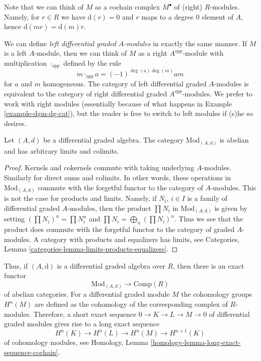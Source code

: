 \noindent
Note that we can think of $M$ as a cochain complex $M^\bullet$
of (right) $R$-modules. Namely, for $r \in R$ we have $\text{d}(r) = 0$
and $r$ maps to a degree $0$ element of $A$, hence
$\text{d}(mr) = \text{d}(m)r$.

\medskip\noindent
We can define {\it left differential graded $A$-modules} in exactly the same
manner. If $M$ is a left $A$-module, then we can think of $M$ as a
right $A^{opp}$-module with multiplication $\cdot_{opp}$ defined by
the rule
$$
m \cdot_{opp} a = (-1)^{\deg(a)\deg(m)} a m
$$
for $a$ and $m$ homogeneous. The category of left differential graded
$A$-modules is equivalent to the category of right differential
graded $A^{opp}$-modules. We prefer to work with right modules
(essentially because of what happens in Example \ref{example-dgm-dg-cat}), but
the reader is free to switch to left modules if (s)he so desires.

\begin{lemma}
\label{lemma-dgm-abelian}
Let $(A, d)$ be a differential graded algebra. The category
$\text{Mod}_{(A, \text{d})}$ is abelian and has arbitrary limits and colimits.
\end{lemma}

\begin{proof}
Kernels and cokernels commute with taking underlying $A$-modules.
Similarly for direct sums and colimits. In other words, these operations
in $\text{Mod}_{(A, \text{d})}$ commute with the forgetful functor to the
category of $A$-modules. This is not the case for products and limits.
Namely, if $N_i$, $i \in I$ is a family of
differential graded $A$-modules, then the product $\prod N_i$ in
$\text{Mod}_{(A, \text{d})}$ is given by setting $(\prod N_i)^n = \prod N_i^n$
and $\prod N_i = \bigoplus_n (\prod N_i)^n$. Thus we see that the product
does commute with the forgetful functor to the category of graded $A$-modules.
A category with products and equalizers has limits, see
Categories, Lemma \ref{categories-lemma-limits-products-equalizers}.
\end{proof}

\noindent
Thus, if $(A, \text{d})$ is a differential graded
algebra over $R$, then there is an exact functor
$$
\text{Mod}_{(A, \text{d})} \longrightarrow \text{Comp}(R)
$$
of abelian categories. For a differential graded module $M$ the
cohomology groups $H^n(M)$ are defined as the cohomology of the
corresponding complex of $R$-modules. Therefore, a short exact
sequence $0 \to K \to L \to M \to 0$ of differential graded modules
gives rise to a long exact sequence
\begin{equation}
\label{equation-les}
H^n(K) \to H^n(L) \to H^n(M) \to H^{n + 1}(K)
\end{equation}
of cohomology modules, see
Homology, Lemma \ref{homology-lemma-long-exact-sequence-cochain}.

